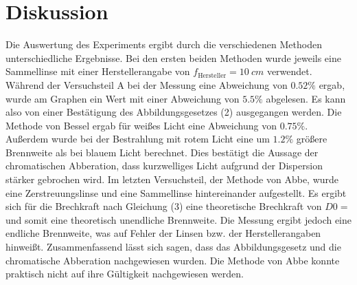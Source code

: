 \section{Diskussion}
Die Auswertung des Experiments ergibt durch die verschiedenen Methoden unterschiedliche Ergebnisse.
Bei den ersten beiden Methoden wurde jeweils eine Sammellinse mit einer Herstellerangabe von $f_\text{Hersteller} = \SI{10}{cm}$ verwendet.
Während der Versuchsteil A bei der Messung eine Abweichung von $0.52 \%$ ergab, wurde am Graphen ein Wert mit einer Abweichung von $5.5 \%$ abgelesen.
Es kann also von einer Bestätigung des Abbildungsgesetzes (2) ausgegangen werden.
Die Methode von Bessel ergab für wei\ss{}es Licht eine Abweichung von $0.75 \%$.
Außerdem wurde bei der Bestrahlung mit rotem Licht eine um $1.2 \%$ größere Brennweite als bei blauem Licht berechnet.
Dies bestätigt die Aussage der chromatischen Abberation, dass kurzwelliges Licht aufgrund der Dispersion stärker gebrochen wird.
Im letzten Versuchsteil, der Methode von Abbe, wurde eine Zerstreuungslinse und eine Sammellinse hintereinander aufgestellt.
Es ergibt sich für die Brechkraft nach Gleichung (3) eine theoretische Brechkraft von $D 0 =$ und somit eine theoretisch unendliche Brennweite.
Die Messung ergibt jedoch eine endliche Brennweite, was auf Fehler der Linsen bzw. der Herstellerangaben hinwei\ss{}t.
Zusammenfassend lässt sich sagen, dass das Abbildungsgesetz und die chromatische Abberation nachgewiesen wurden.
Die Methode von Abbe konnte praktisch nicht auf ihre Gültigkeit nachgewiesen werden.
